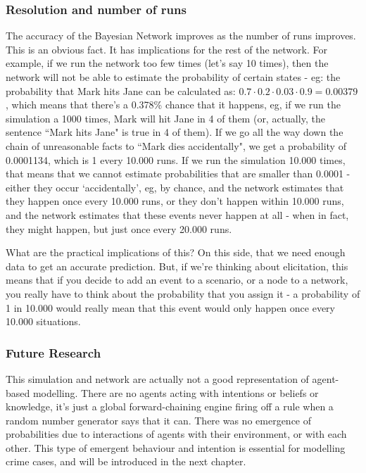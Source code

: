 \subsubsection{Resolution and number of runs}
The accuracy of the Bayesian Network improves as the number of runs improves. This is an obvious fact. It has implications for the rest of the network. For example, if we run the network too few times (let's say 10 times), then the network will not be able to estimate the probability of certain states - eg: the probability that Mark hits Jane can be calculated as: $0.7 \cdot 0.2 \cdot 0.03 \cdot 0.9 = 0.00379$, which means that there's a 0.378\% chance that it happens, eg, if we run the simulation a 1000 times, Mark will hit Jane in 4 of them (or, actually, the sentence ``Mark hits Jane" is true in 4 of them). If we go all the way down the chain of unreasonable facts to ``Mark dies accidentally", we get a probability of 0.0001134, which is 1 every 10.000 runs. If we run the simulation 10.000 times, that means that we cannot estimate probabilities that are smaller than 0.0001 - either they occur `accidentally', eg, by chance, and the network estimates that they happen once every 10.000 runs, or they don't happen within 10.000 runs, and the network estimates that these events never happen at all - when in fact, they might happen, but just once every 20.000 runs.

What are the practical implications of this? On this side, that we need enough data to get an accurate prediction. But, if we're thinking about elicitation, this means that if you decide to add an event to a scenario, or a node to a network, you really have to think about the probability that you assign it - a probability of 1 in 10.000 would really mean that this event would only happen once every 10.000 situations.

\subsubsection{Future Research}
This simulation and network are actually not a good representation of agent-based modelling. There are no agents acting with intentions or beliefs or knowledge, it's just a global forward-chaining engine firing off a rule when a random number generator says that it can. There was no emergence of probabilities due to interactions of agents with their environment, or with each other. This type of emergent behaviour and intention is essential for modelling crime cases, and will be introduced in the next chapter.


